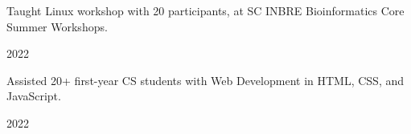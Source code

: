\begin{cvleadership}
{\begin{cvitems}
                \item {Taught Linux workshop with 20 participants, at SC INBRE Bioinformatics Core Summer Workshops.}
            \end{cvitems}
        }
        {}
        {2022} %
    \cvled
        {
            \begin{cvitems}
                \item {Assisted 20+ first-year CS students with Web Development in HTML, CSS, and JavaScript.}
            \end{cvitems}
        }
        {}
        {2022} %
\end{cvleadership}
% 